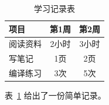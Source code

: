 \documentclass[12pt,a4paper]{ctexart} %
\begin{document}
\begin{table}[htbp] %
  \centering %
  \begin{tabular}{lcc} %
    \hline
    项目 & 第1周 & 第2周 \\ %
    \hline
    阅读资料 & 2小时 & 3小时 \\
    写笔记 & 1页 & 2页 \\
    编译练习 & 3次 & 5次 \\
    \hline
  \end{tabular}
  \caption{学习记录表} %
  \label{tab:study} %
\end{table}

表~\ref{tab:study} 给出了一份简单记录。 %
\end{document}
